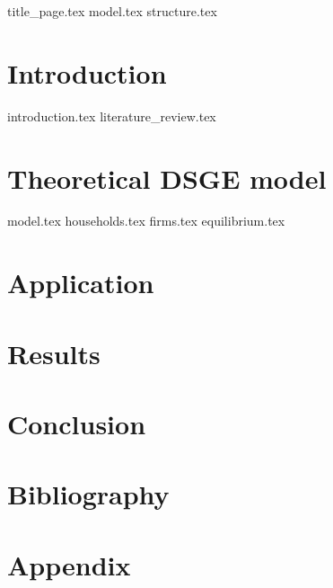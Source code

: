 \documentclass[12pt]{article}
\begin{document}
{title_page.tex}
{model.tex}
\pagebreak
{structure.tex}
\pagebreak
\section{Introduction}
{introduction.tex}
{literature_review.tex}

\section{Theoretical DSGE model}
{model.tex}
{households.tex}
{firms.tex}
{equilibrium.tex}
\section{Application} \label{application}
\section{Results}
\section{Conclusion}
\section{Bibliography}
\printbibliography
\section{Appendix}
\end{document}
